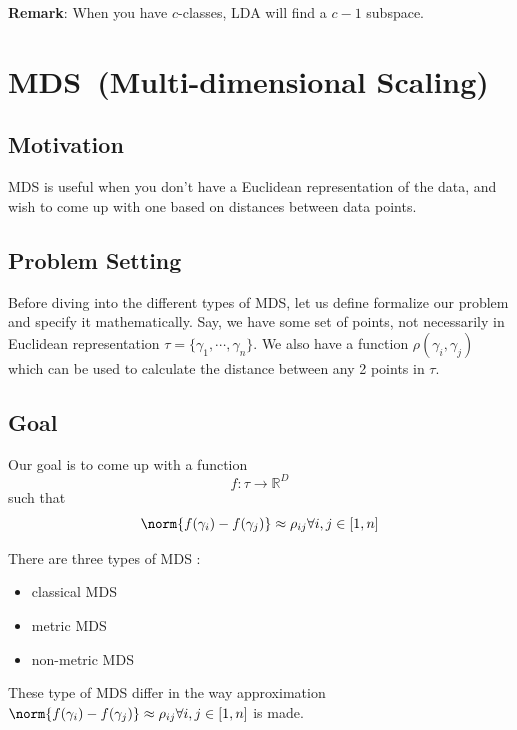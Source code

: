 \noindent \textbf{Remark}: When you have $c$-classes, LDA will find a
$c-1$ subspace. \\ 

\section{MDS~(Multi-dimensional Scaling)}
\subsection{Motivation} MDS is useful when you don't have a Euclidean representation of the
data, and wish to come up with one based on distances between data
points.\\
\subsection{Problem Setting} Before diving into the different types of MDS, let us define formalize our problem and specify it mathematically. Say, we have some set of points, not necessarily in Euclidean representation $\tau = \{\gamma_1, \cdots, \gamma_n\}$. We also have a function $\rho(\gamma_i, \gamma_j)$ which can be used to calculate the distance between any 2 points in $\tau$.
\subsection{Goal} Our goal is to come up with a function $$f: \tau  \rightarrow \mathbb{R}^D$$ such that $$\norm{f(\gamma_i) - f(\gamma_j)} \approx \rho_{ij} \forall i,j \in [1,n]$$  

There are three types of MDS : 
\begin{itemize}
\item classical MDS
\item metric MDS
\item non-metric MDS
\end{itemize}
These type of MDS differ in the way approximation  $\norm{f(\gamma_i) - f(\gamma_j)} \approx \rho_{ij} \forall i,j \in [1,n]$ is made.\\
